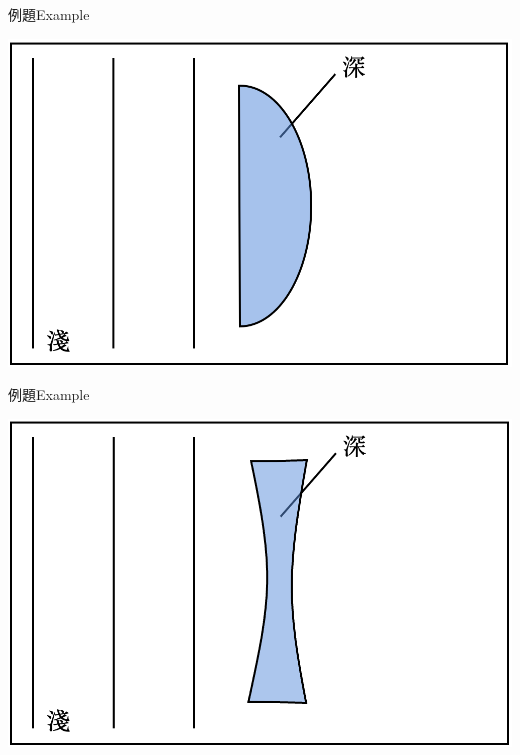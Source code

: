 \documentclass[beamer=true]{standalone}
\begin{document}
\begin{frame}[t]{例題Example}
    \par{\par\centering\includegraphics[width=\textwidth]{./img/ch2_cf_2024-05-24-15-17-52.png}\par}
\end{frame}

\begin{frame}[t]{例題Example}
    \par{\par\centering\includegraphics[width=\textwidth]{./img/ch2_cf_2024-05-24-15-18-16.png}\par}
\end{frame}
\end{document}
